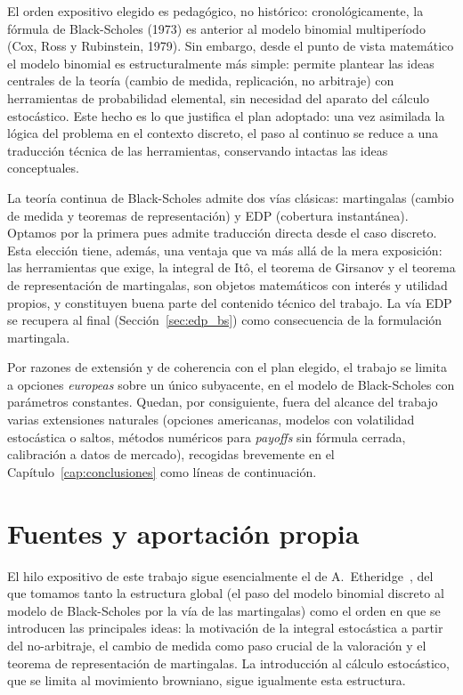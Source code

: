 \documentclass[11pt,a4paper,oneside]{report}
\theoremstyle{plain}
\theoremstyle{definition}
\theoremstyle{remark}
\newcommand{\1}{\mathbf{1}}
\begin{document}
El orden
expositivo elegido es pedagógico, no histórico: cronológicamente, la
fórmula de Black-Scholes (1973) es anterior al modelo binomial
multiperíodo (Cox, Ross y Rubinstein, 1979). Sin embargo, desde el
punto de vista matemático el modelo binomial es estructuralmente más
simple: permite plantear las ideas centrales de la teoría (cambio de
medida, replicación, no arbitraje) con herramientas de probabilidad
elemental, sin necesidad del aparato del cálculo estocástico. Este
hecho es lo que justifica el plan adoptado: una vez asimilada la lógica del
problema en el contexto discreto, el paso al continuo se reduce a una
traducción técnica de las herramientas, conservando intactas las ideas
conceptuales.

La teoría continua de
Black-Scholes admite dos vías clásicas: martingalas (cambio de
medida y teoremas de representación) y EDP (cobertura instantánea).
Optamos por la primera pues admite traducción directa desde el
caso discreto. Esta elección tiene, además, una ventaja que va más allá de la mera exposición: las
herramientas que exige, la integral de Itô, el teorema de Girsanov y
el teorema de representación de martingalas, son objetos matemáticos
con interés y utilidad propios, y constituyen buena parte del contenido técnico del trabajo. La vía EDP se recupera al final
(Sección~\ref{sec:edp_bs}) como consecuencia de la formulación
martingala.

Por razones de extensión
y de coherencia con el plan elegido, el trabajo se limita a opciones
\emph{europeas} sobre un único subyacente, en el modelo de Black-Scholes
con parámetros constantes. Quedan, por consiguiente, fuera del alcance
del trabajo varias extensiones naturales (opciones americanas,
modelos con volatilidad estocástica o saltos, métodos numéricos para
\emph{payoffs} sin fórmula cerrada, calibración a datos de mercado),
recogidas brevemente en el Capítulo~\ref{cap:conclusiones} como líneas
de continuación.

\section{Fuentes y aportación propia}
\label{sec:aportacion}

El hilo expositivo de este trabajo sigue esencialmente el de
A.~Etheridge~\cite{etheridge}, del que tomamos tanto la estructura
global (el paso del modelo binomial discreto al modelo de
Black-Scholes por la vía de las martingalas) como el orden en que se
introducen las principales ideas: la motivación de la integral estocástica a partir
del no-arbitraje, el cambio de medida como paso crucial de la valoración
y el teorema de representación de martingalas. La introducción al cálculo estocástico, que se limita al movimiento browniano, sigue igualmente esta estructura.
\end{document}
